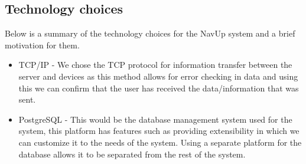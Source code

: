 \documentclass{article}
\begin{document}
\subsection{Technology choices}
Below is a summary of the technology choices for the NavUp system and a brief motivation for them.
\begin{itemize}
  \item TCP/IP - We chose the TCP protocol for information transfer between the server and devices as this method allows for error checking in data and using this we can confirm that the user has received the data/information that was sent.
  \item PostgreSQL - This would be the database management system used for the system, this platform has features such as providing extensibility in which we can customize it to the needs of the system.  Using a separate platform for the database allows it to be separated from the rest of the system. 


\end{itemize}
\end{document}
